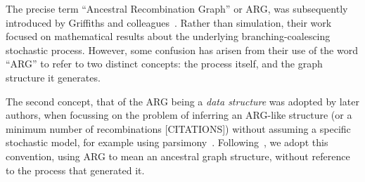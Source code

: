 \documentclass{article}
\begin{document}

The precise term ``Ancestral Recombination Graph'' or ARG, was subsequently introduced by
Griffiths and colleagues~\citep{griffiths1991two,ethier1990two,griffiths1996ancestral,griffiths1997ancestral}.
Rather than simulation, their work focused on mathematical results about the underlying branching-coalescing
stochastic process. However, some confusion has arisen from their use of the word ``ARG'' to refer to
two distinct concepts: the process itself, and the graph structure it generates.


The second concept, that of the ARG being a \emph{data structure} was adopted by later authors,
when focussing on the problem of inferring an ARG-like structure (or a minimum number of
recombinations [CITATIONS]) without assuming a specific stochastic
model, for example using parsimony~\citep{song2003parsimonious,song2005efficient,lyngso2005minimum}.
Following~\citet{minichiello2006mapping}, we adopt this convention, using ARG
to mean an ancestral graph structure, without reference to the process that generated it.
\end{document}
